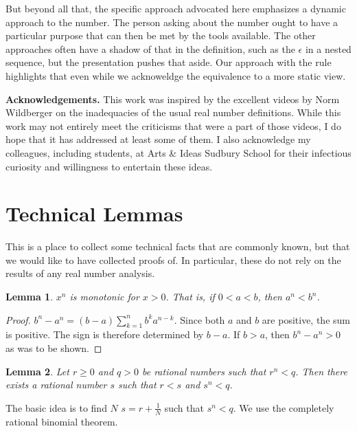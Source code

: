 \documentclass[12pt]{article}
\newtheorem{lemma}{Lemma}
\theoremstyle{remark}
\begin{document}
But beyond all that, the specific approach advocated here emphasizes a dynamic approach to the number. The person asking about the number ought to have a particular purpose that can then be met by the tools available. The other approaches often have a shadow of that in the definition, such as the $\epsilon$ in a nested sequence, but the presentation pushes that aside. Our approach with the rule highlights that even while we acknoweldge the equivalence to a more static view. 

\bigskip

\noindent \textbf{Acknowledgements. } This work was inspired by the excellent videos by Norm Wildberger on the inadequacies of the usual real number definitions. While this work may not entirely meet the criticisms that were a part of those videos, I do hope that it has addressed at least some of them. I also acknowledge my colleagues, including students, at Arts \& Ideas Sudbury School for their infectious curiosity and willingness to entertain these ideas.

\appendix

\section{Technical Lemmas}\label{app:A}

This is a place to collect some technical facts that are commonly known, but that we would like to have collected proofs of. In particular, these do not rely on the results of any real number analysis. 

\begin{lemma}
$x^n$ is monotonic for $x>0$. That is, if $0 < a < b$, then $a^n<b^n$.
\end{lemma}

\begin{proof}
$b^n-a^n= (b-a)\sum_{k=1}^n b^k a^{n-k}$. Since both $a$ and $b$ are positive, the sum is positive. The sign is therefore determined by $b-a$. If $b>a$, then $b^n-a^n > 0$ as was to be shown. 
\end{proof}

\begin{lemma}\label{app:lesser}
Let $r \geq 0 $ and $q > 0$ be rational numbers such that $r^n < q$. Then there exists a rational number $s$ such that $r < s$ and $s^n < q$.
\end{lemma}

The basic idea is to find $N$ $s = r + \tfrac{1}{N}$ such that $s^n < q$. We use the completely rational binomial theorem.  
\end{document}
